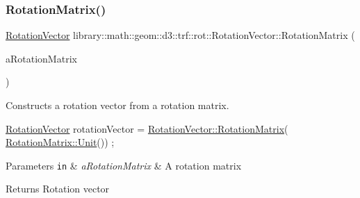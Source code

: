 \subsubsection{\texorpdfstring{Rotation\+Matrix()}{RotationMatrix()}}
{\footnotesize\ttfamily \hyperlink{classlibrary_1_1math_1_1geom_1_1d3_1_1trf_1_1rot_1_1_rotation_vector}{Rotation\+Vector} library\+::math\+::geom\+::d3\+::trf\+::rot\+::\+Rotation\+Vector\+::\+Rotation\+Matrix (\begin{DoxyParamCaption}\item[{const \hyperlink{classlibrary_1_1math_1_1geom_1_1d3_1_1trf_1_1rot_1_1_rotation_matrix}{rot\+::\+Rotation\+Matrix} \&}]{a\+Rotation\+Matrix }\end{DoxyParamCaption})\hspace{0.3cm}{\ttfamily [static]}}



Constructs a rotation vector from a rotation matrix. 


\begin{DoxyCode}
\hyperlink{classlibrary_1_1math_1_1geom_1_1d3_1_1trf_1_1rot_1_1_rotation_vector_a49076a279f457fdb14c4a9d4d61e1738}{RotationVector} rotationVector = \hyperlink{classlibrary_1_1math_1_1geom_1_1d3_1_1trf_1_1rot_1_1_rotation_vector_a397807ffe12bb72cd788660b83bdf7b3}{RotationVector::RotationMatrix}(
      \hyperlink{classlibrary_1_1math_1_1geom_1_1d3_1_1trf_1_1rot_1_1_rotation_matrix_aeb5324151ee55348fa16c5fe78b036ed}{RotationMatrix::Unit}()) ;
\end{DoxyCode}



\begin{DoxyParams}[1]{Parameters}
\mbox{\tt in}  & {\em a\+Rotation\+Matrix} & A rotation matrix \\
\hline
\end{DoxyParams}
\begin{DoxyReturn}{Returns}
Rotation vector 
\end{DoxyReturn}
\mbox{\label{classlibrary_1_1math_1_1geom_1_1d3_1_1trf_1_1rot_1_1_rotation_vector_a33b2f1e9a3fb983dccd3bfc3c7c33327}} 
